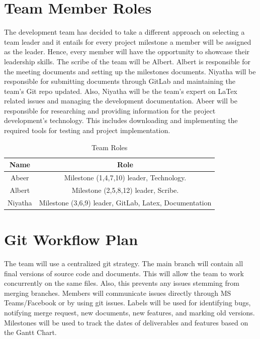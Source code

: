 \documentclass{article}
\begin{document}
\section{Team Member Roles}
The development team has decided to take a different approach on selecting a team leader and it entails for every project milestone a member will be assigned as the leader. Hence, every member will have the opportunity to showcase their leadership skills. 
The scribe of the team will be Albert. Albert is responsible for the meeting documents and setting up the milestones documents. Niyatha will be responsible for submitting documents through GitLab and maintaining the team's Git repo updated. Also, Niyatha will be the team's expert on LaTex related issues and managing the development documentation. Abeer will be responsible for researching and providing information for the project development's technology. This includes downloading and implementing the required tools for testing and project implementation. 

\begin{table}[h!]
    \centering
    \begin{tabular}{|c|c|}
         \hline
         Name & Role\\
         \hline
         Abeer & Milestone (1,4,7,10) leader, Technology.\\
         \hline
         Albert & Milestone (2,5,8,12) leader, Scribe.\\
         \hline
         Niyatha & Milestone (3,6,9) leader, GitLab, Latex, Documentation \\
         \hline
    \end{tabular}
    \caption{Team Roles}
    \label{tab:my_roles}
\end{table}

\section{Git Workflow Plan}

The team will use a centralized git strategy. The main branch will contain all final versions of source code and documents. This will allow the team to work concurrently on the same files. Also, this prevents any issues stemming from merging branches. Members will communicate issues directly through MS Teams/Facebook or by using git issues. Labels will be used for identifying bugs, notifying merge request, new documents, new features, and marking old versions. Milestones will be used to track the dates of deliverables and features based on the Gantt Chart.
\end{document}
